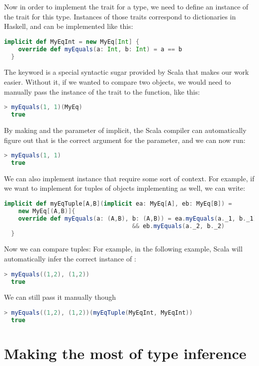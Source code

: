 Now in order to implement the trait for a type, we need to define an instance
of the trait for this type. Instances of those traits correspond to dictionaries
in Haskell, and can be implemented like this:
\begin{lstlisting}[language=Scala,gobble=6]
  implicit def MyEqInt = new MyEq[Int] {
    override def myEquals(a: Int, b: Int) = a == b
  }
\end{lstlisting}
The  keyword is a special syntactic sugar provided by Scala
that makes our work easier. Without it, if we wanted to compare two objects,
we would need to manually pass the instance of the trait to the function,
like this:
\begin{lstlisting}[language=Scala,gobble=6]
  > myEquals(1, 1)(MyEq)
  true
\end{lstlisting}
By making  and the  parameter of  implicit,
the Scala compiler can automatically figure out that  is the
correct argument for the  parameter, and we can now run:
\begin{lstlisting}[language=Scala,gobble=6]
  > myEquals(1, 1)
  true
\end{lstlisting}


We can also implement instance that require some sort of context. For
example, if we want to implement  for tuples of objects implementing
 as well, we can write:
\begin{lstlisting}[language=Scala,gobble=6]
  implicit def myEqTuple[A,B](implicit ea: MyEq[A], eb: MyEq[B]) =
    new MyEq[(A,B)]{
    override def myEquals(a: (A,B), b: (A,B)) = ea.myEquals(a._1, b._1)
                                    && eb.myEquals(a._2, b._2)
  }
\end{lstlisting}
Now we can compare tuples: For example, in the following example, Scala will
automatically infer the correct instance of :
\begin{lstlisting}[language=Scala,gobble=6]
  > myEquals((1,2), (1,2))
  true
\end{lstlisting}
We can still pass  it manually though
\begin{lstlisting}[language=Scala,gobble=6]
  > myEquals((1,2), (1,2))(myEqTuple(MyEqInt, MyEqInt))
  true
\end{lstlisting}

\section{Making the most of type inference}
\label{type-inference}

